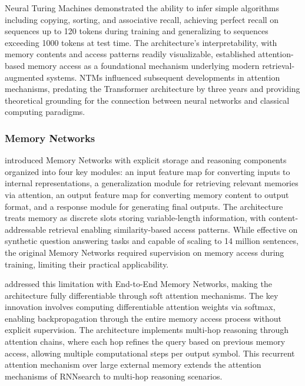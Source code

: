 Neural Turing Machines demonstrated the ability to infer simple algorithms including copying, sorting, and associative recall, achieving perfect recall on sequences up to 120 tokens during training and generalizing to sequences exceeding 1000 tokens at test time. The architecture's interpretability, with memory contents and access patterns readily visualizable, established attention-based memory access as a foundational mechanism underlying modern retrieval-augmented systems. NTMs influenced subsequent developments in attention mechanisms, predating the Transformer architecture by three years and providing theoretical grounding for the connection between neural networks and classical computing paradigms.

\subsubsection{Memory Networks}

\citet{weston2015memory} introduced Memory Networks with explicit storage and reasoning components organized into four key modules: an input feature map for converting inputs to internal representations, a generalization module for retrieving relevant memories via attention, an output feature map for converting memory content to output format, and a response module for generating final outputs. The architecture treats memory as discrete slots storing variable-length information, with content-addressable retrieval enabling similarity-based access patterns. While effective on synthetic question answering tasks and capable of scaling to 14 million sentences, the original Memory Networks required supervision on memory access during training, limiting their practical applicability.

\citet{sukhbaatar2015end} addressed this limitation with End-to-End Memory Networks, making the architecture fully differentiable through soft attention mechanisms. The key innovation involves computing differentiable attention weights via softmax, enabling backpropagation through the entire memory access process without explicit supervision. The architecture implements multi-hop reasoning through attention chains, where each hop refines the query based on previous memory access, allowing multiple computational steps per output symbol. This recurrent attention mechanism over large external memory extends the attention mechanisms of RNNsearch to multi-hop reasoning scenarios.


